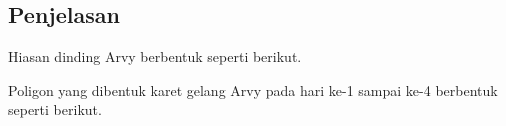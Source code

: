 \documentclass{article}
\begin{document}
\subsection*{Penjelasan}
Hiasan dinding Arvy berbentuk seperti berikut.
\begin{center}
\end{center}
Poligon yang dibentuk karet gelang Arvy pada hari ke-1 sampai ke-4 berbentuk seperti berikut.
\end{document}
